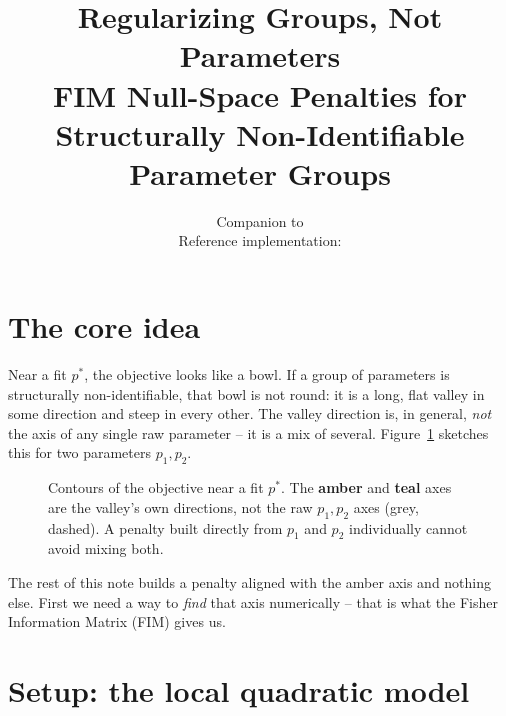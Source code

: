 \documentclass[11pt]{article}
\title{Regularizing Groups, Not Parameters\\[2pt]
\large FIM Null-Space Penalties for Structurally Non-Identifiable Parameter Groups}
\author{}
\date{Companion to \file{notes/fim\_l2\_regularization\_calculations.tex}\\
Reference implementation: \file{scripts/fim\_l2\_constraintL2.R}}
\newcommand{\stiff}[1]{\textcolor{stiffcol}{\textbf{#1}}}
\newcommand{\slop}[1]{\textcolor{sloppycol}{\textbf{#1}}}
\begin{document}
\maketitle
\vspace{-1.5em}

\section{The core idea}

Near a fit $p^*$, the objective looks like a bowl. If a group of parameters is
structurally non-identifiable, that bowl is not round: it is a long, flat
valley in some direction and steep in every other. The valley direction is,
in general, \emph{not} the axis of any single raw parameter -- it is a mix of
several. Figure~\ref{fig:valley} sketches this for two parameters $p_1, p_2$.

\begin{figure}[h]
\centering
{}
\caption{Contours of the objective near a fit $p^*$. The \slop{amber} and
\stiff{teal} axes are the valley's own directions, not the raw $p_1,p_2$ axes
(grey, dashed). A penalty built directly from $p_1$ and $p_2$ individually
cannot avoid mixing both.}
\label{fig:valley}
\end{figure}

The rest of this note builds a penalty aligned with the amber axis and
nothing else. First we need a way to \emph{find} that axis numerically --
that is what the Fisher Information Matrix (FIM) gives us.

\section{Setup: the local quadratic model}
\end{document}
